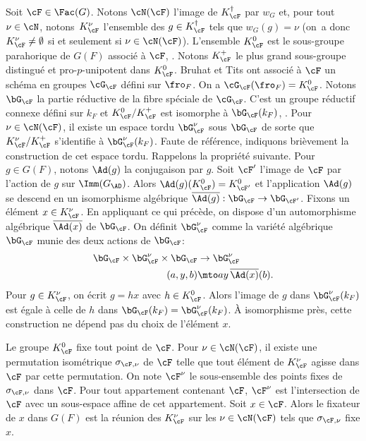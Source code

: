 Soit $\cF\in \Fac(G)$. Notons $\cN(\cF)$ l'image de $K_{\cF}^{\dag}$ par $w_{G}$ et, pour tout $\nu\in \cN$, notons~$K_{\cF}^{\nu}$ l'ensemble des $g\in K_{\cF}^{\dag}$ tels que $w_{G}(g)=\nu$ (on~a donc $ K_{\cF}^{\nu}\neq\emptyset$ si et seulement si $\nu\in \cN(\cF)$). L'ensemble $K_{\cF}^{0}$ est le sous-groupe parahorique de $G(F)$ associé à $\cF$, \cf \cite[Prop.\,3]{HR}. Notons $K_{\cF}^{+}$ le plus grand sous-groupe distingué et pro-$p$-unipotent dans $K_{\cF}^0$. Bruhat et Tits ont associé à $\cF$ un schéma en groupes $\cG_{\cF}$ défini sur $\fro_{F}$. On a $\cG_{\cF}(\fro_{F})=K_{\cF}^{0}$. Notons $\bG_{\cF}$ la partie réductive de la fibre spéciale de $\cG_{\cF}$. C'est un groupe réductif connexe défini sur $k_{F}$ et $K_{\cF}^0/K_{\cF}^+$ est isomorphe à $\bG_{\cF}(k_{F})$, \cf \cite[Prop.\,3.7]{HV}. Pour $\nu\in \cN(\cF)$, il existe un espace tordu $\bG_{\cF}^{\nu}$ sous $\bG_{\cF}$ de sorte que $K_{\cF}^{\nu}/K_{\cF}^{+}$ s'identifie à $\bG_{\cF}^{\nu}(k_{F})$. Faute de référence, indiquons brièvement la construction de cet espace tordu. Rappelons la propriété suivante. Pour $g\in G(F)$, notons $\Ad(g)$ la conjugaison par $g$. Soit $\cF'$ l'image de $\cF$ par l'action de $g$ sur $\Imm(G_{\AD})$. Alors $\Ad(g)(K_{\cF}^0)=K_{\cF'}^0$ et l'application $\Ad(g)$ se descend en un isomorphisme algébrique $\overline{\Ad(g)}:\bG_{\cF}\to \bG_{\cF'}$. Fixons
un élément $x\in K_{\cF}^{\nu}$. En appliquant ce qui précède, on dispose d'un automorphisme algébrique $\overline{\Ad(x)}$ de $\bG_{\cF}$. On définit $\bG_{\cF}^{\nu}$ comme la variété algébrique $\bG_{\cF}$ munie des deux actions de $\bG_{\cF}$:
\begin{align*}
\bG_{\cF}\times \bG_{\cF}^{\nu}\times \bG_{\cF}&\to\bG_{\cF}^{\nu}\\(a,y,b)&\mto ay\,\overline{\Ad(x)}(b).
\end{align*}
Pour $g\in K_{\cF}^{\nu}$, on écrit $g=hx$ avec $h\in K_{\cF}^0$. Alors l'image de $g$ dans $\bG_{\cF}^{\nu}(k_{F})$ est égale à celle de $h$ dans $\bG_{\cF}(k_{F})=\bG_{\cF}^{\nu}(k_{F})$. À isomorphisme près, cette construction ne dépend pas du choix de l'élément $x$.

Le groupe $K_{\cF}^0$ fixe tout point de $\cF$. Pour $\nu\in \cN(\cF)$, il existe une permutation isométrique $\sigma_{\cF,\nu}$ de $\cF$ telle que tout élément de $K_{\cF}^{\nu}$ agisse dans $\cF$ par cette permutation. On note $\cF^{\nu}$ le sous-ensemble des points fixes de $\sigma_{\cF,\nu}$ dans $\cF$. Pour tout appartement contenant $\cF$, $\cF^{\nu}$ est l'intersection de $\cF$ avec un sous-espace affine de cet appartement. Soit $x\in \cF$. Alors le fixateur de $x$ dans $G(F)$ est la réunion des $K_{\cF}^{\nu}$ sur les $\nu\in \cN(\cF)$ tels que $\sigma_{\cF,\nu}$ fixe $x$.

